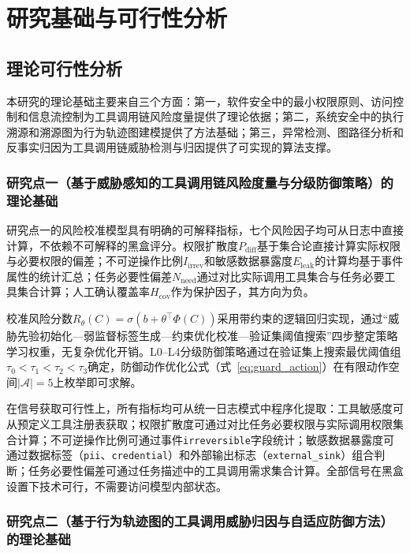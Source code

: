 \section{研究基础与可行性分析}
\subsection{理论可行性分析}

本研究的理论基础主要来自三个方面：第一，软件安全中的最小权限原则、访问控制和信息流控制为工具调用链风险度量提供了理论依据；第二，系统安全中的执行溯源和溯源图为行为轨迹图建模提供了方法基础；第三，异常检测、图路径分析和反事实归因为工具调用链威胁检测与归因提供了可实现的算法支撑。

\subsubsection{研究点一（基于威胁感知的工具调用链风险度量与分级防御策略）的理论基础}

研究点一的风险校准模型具有明确的可解释指标，七个风险因子均可从日志中直接计算，不依赖不可解释的黑盒评分。权限扩散度$P_{\text{diff}}$基于集合论直接计算实际权限与必要权限的偏差；不可逆操作比例$I_{\text{irrev}}$和敏感数据暴露度$E_{\text{leak}}$的计算均基于事件属性的统计汇总；任务必要性偏差$N_{\text{need}}$通过对比实际调用工具集合与任务必要工具集合计算；人工确认覆盖率$H_{\text{cov}}$作为保护因子，其方向为负。

校准风险分数$R_\theta(C) = \sigma(b + \theta^\top \Phi(C))$采用带约束的逻辑回归实现，通过“威胁先验初始化—弱监督标签生成—约束优化校准—验证集阈值搜索”四步整定策略学习权重，无复杂优化开销。L0--L4分级防御策略通过在验证集上搜索最优阈值组$\tau_0 < \tau_1 < \tau_2 < \tau_3$确定，防御动作优化公式（式~\ref{eq:guard_action}）在有限动作空间$|\mathcal{A}|=5$上枚举即可求解。

在信号获取可行性上，所有指标均可从统一日志模式中程序化提取：工具敏感度可从预定义工具注册表获取；权限扩散度可通过对比任务必要权限与实际调用权限集合计算；不可逆操作比例可通过事件\texttt{irreversible}字段统计；敏感数据暴露度可通过数据标签（\texttt{pii}、\texttt{credential}）和外部输出标志（\texttt{external\_sink}）组合判断；任务必要性偏差可通过任务描述中的工具调用需求集合计算。全部信号在黑盒设置下技术可行，不需要访问模型内部状态。

\subsubsection{研究点二（基于行为轨迹图的工具调用威胁归因与自适应防御方法）的理论基础}

